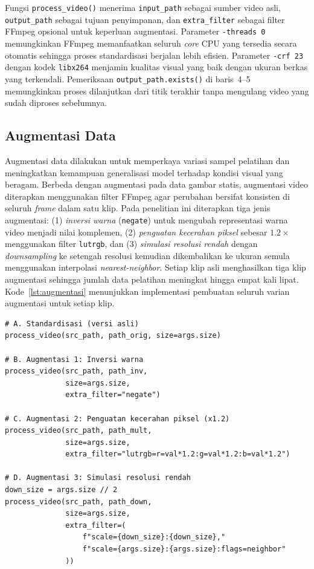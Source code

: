 Fungsi \texttt{process\_video()} menerima \texttt{input\_path} sebagai sumber video asli, \texttt{output\_path} sebagai tujuan penyimpanan, dan \texttt{extra\_filter} sebagai filter FFmpeg opsional untuk keperluan augmentasi. Parameter \texttt{-threads 0} memungkinkan FFmpeg memanfaatkan seluruh \textit{core} CPU yang tersedia secara otomatis sehingga proses standardisasi berjalan lebih efisien. Parameter \texttt{-crf 23} dengan kodek \texttt{libx264} menjamin kualitas visual yang baik dengan ukuran berkas yang terkendali. Pemeriksaan \texttt{output\_path.exists()} di baris~4--5 memungkinkan proses dilanjutkan dari titik terakhir tanpa mengulang video yang sudah diproses sebelumnya.\par

\subsection{Augmentasi Data} \label{IV.Augmentasi}

Augmentasi data dilakukan untuk memperkaya variasi sampel pelatihan dan meningkatkan kemampuan generalisasi model terhadap kondisi visual yang beragam. Berbeda dengan augmentasi pada data gambar statis, augmentasi video diterapkan menggunakan filter FFmpeg agar perubahan bersifat konsisten di seluruh \textit{frame} dalam satu klip. Pada penelitian ini diterapkan tiga jenis augmentasi: (1) \textit{inversi warna} (\texttt{negate}) untuk mengubah representasi warna video menjadi nilai komplemen, (2) \textit{penguatan kecerahan piksel} sebesar $1.2\times$ menggunakan filter \texttt{lutrgb}, dan (3) \textit{simulasi resolusi rendah} dengan \textit{downsampling} ke setengah resolusi kemudian dikembalikan ke ukuran semula menggunakan interpolasi \textit{nearest-neighbor}. Setiap klip asli menghasilkan tiga klip augmentasi sehingga jumlah data pelatihan meningkat hingga empat kali lipat. Kode~\ref{lst:augmentasi} menunjukkan implementasi pembuatan seluruh varian augmentasi untuk setiap klip.\par

\begin{lstlisting}[caption={Kode augmentasi data video}, label={lst:augmentasi}]
# A. Standardisasi (versi asli)
process_video(src_path, path_orig, size=args.size)

# B. Augmentasi 1: Inversi warna
process_video(src_path, path_inv,
              size=args.size,
              extra_filter="negate")

# C. Augmentasi 2: Penguatan kecerahan piksel (x1.2)
process_video(src_path, path_mult,
              size=args.size,
              extra_filter="lutrgb=r=val*1.2:g=val*1.2:b=val*1.2")

# D. Augmentasi 3: Simulasi resolusi rendah
down_size = args.size // 2
process_video(src_path, path_down,
              size=args.size,
              extra_filter=(
                  f"scale={down_size}:{down_size},"
                  f"scale={args.size}:{args.size}:flags=neighbor"
              ))
\end{lstlisting}

